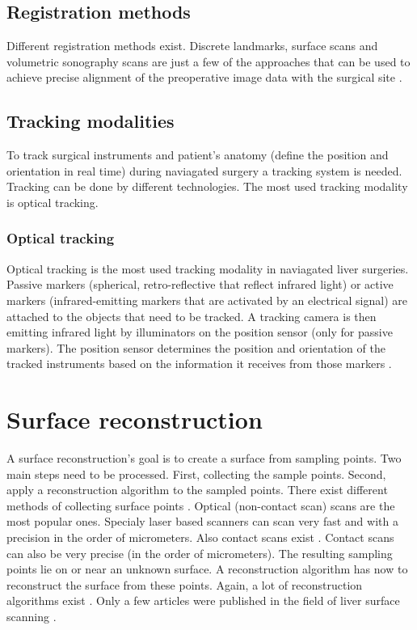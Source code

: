 \subsection{Registration methods}
Different registration methods exist. Discrete landmarks, surface scans and
volumetric sonography scans are just a few of the approaches that can be
used to achieve precise alignment of the preoperative image data with the
surgical site \cite{banz2016intraoperative}.

\subsection{Tracking modalities}
To track surgical instruments and patient's anatomy (define the position and
orientation in real time) during naviagated surgery a tracking system is needed.
Tracking can be done by different technologies. The most used tracking
modality is optical tracking. 

\subsubsection{Optical tracking}
Optical tracking is the most used tracking modality in naviagated liver
surgeries. Passive markers (spherical, retro-reflective that reflect infrared
light) or active markers (infrared-emitting markers that are activated by an
electrical signal) \cite{wiles2004accuracy} are attached to the objects that
need to be tracked. A tracking camera is then emitting infrared light by illuminators
on the position sensor (only for passive markers). The position sensor
determines the position and orientation of the tracked instruments based on the
information it receives from those markers \cite{noauthor_polaris_nodate}.  

\section{Surface reconstruction}
A surface reconstruction's goal is to create a surface from sampling points. Two
main steps need to be processed. First, collecting the sample points. Second,
apply a reconstruction algorithm to the sampled points. There exist different
methods of collecting surface points
\cite{franca20053d}\cite{levoy2000digital}\cite{cui20113d}\cite{chu2002infrared}\cite{dou20153d}.
Optical (non-contact scan) scans are the most popular ones. Specialy laser based
scanners can scan very fast and with a precision in the order of micrometers. Also contact scans exist
\cite{pai2001scanning}. Contact scans can also be very precise (in the order of
micrometers).
The resulting sampling points lie on or near an unknown surface. A
reconstruction algorithm has now to reconstruct the surface from these points.
Again, a lot of reconstruction algorithms exist \cite{lim2014surface}. Only a
few articles were published in the
field of liver surface scanning \cite{maier2014comparative} \cite{thompson2015accuracy}. 





\endinput
